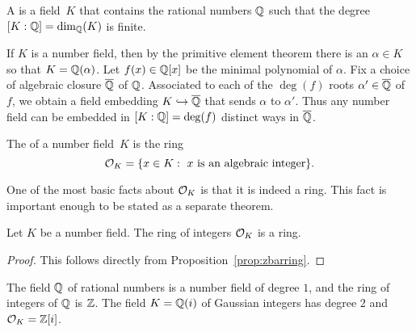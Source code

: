 \begin{definition}
  A  is a field~$K$ that contains the rational
  numbers $\mathbb{Q}$ such that the degree $[K:\mathbb{Q}] = \dim_{\mathbb{Q}}(K)$ is finite.
\end{definition}

If $K$ is a number field, then by the primitive element theorem there
is an $\alpha \in K$ so that $K = \mathbb{Q}(\alpha)$.  Let $f(x) \in \mathbb{Q}[x]$
be the minimal polynomial of $\alpha$.  Fix a choice of algebraic
closure $\overline{\mathbb{Q}}$ of $\mathbb{Q}$.  Associated to each of the $\deg(f)$ roots
$\alpha'\in\overline{\mathbb{Q}}$ of $f$, we obtain a field embedding $K \hookrightarrow \overline{\mathbb{Q}}$
that sends $\alpha$ to $\alpha'$.  Thus any number field can be
embedded in $[K:\mathbb{Q}]=\deg(f)$ distinct ways in $\overline{\mathbb{Q}}$.

\begin{definition}
  The  of a number field~$K$ is the ring
  $$
    \mathcal{O}_K = \{x \in K : \text{ $x$ is an algebraic integer}\}.
  $$
\end{definition}

One of the most basic facts about $\mathcal{O}_K$ is that it is indeed a ring.
This fact is important enough to be stated as a separate theorem.

\begin{theorem}
  Let $K$ be a number field.
  The ring of integers $\mathcal{O}_K$ is a ring.
\end{theorem}
\begin{proof}
  This follows directly from Proposition~\ref{prop:zbarring}.
\end{proof}


\begin{example}
  The field $\mathbb{Q}$ of rational numbers is a number field of degree $1$,
  and the ring of integers of $\mathbb{Q}$ is $\mathbb{Z}$.  The field $K=\mathbb{Q}(i)$ of
  Gaussian integers has degree $2$ and $\mathcal{O}_K = \mathbb{Z}[i]$.
\end{example}

